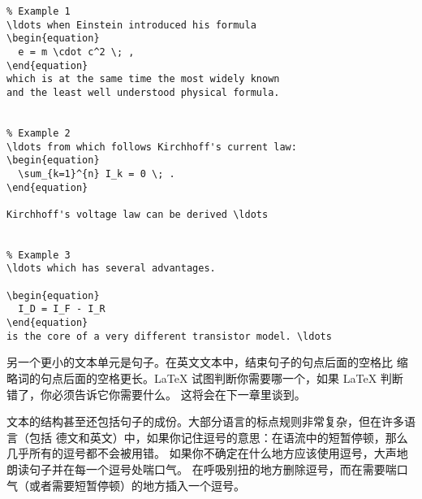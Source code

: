 \begin{code}
\begin{verbatim}
% Example 1
\ldots when Einstein introduced his formula
\begin{equation}
  e = m \cdot c^2 \; ,
\end{equation}
which is at the same time the most widely known
and the least well understood physical formula.


% Example 2
\ldots from which follows Kirchhoff's current law:
\begin{equation}
  \sum_{k=1}^{n} I_k = 0 \; .
\end{equation}

Kirchhoff's voltage law can be derived \ldots


% Example 3
\ldots which has several advantages.

\begin{equation}
  I_D = I_F - I_R
\end{equation}
is the core of a very different transistor model. \ldots
\end{verbatim}
\end{code}

另一个更小的文本单元是句子。在英文文本中，结束句子的句点后面的空格比
缩略词的句点后面的空格更长。\LaTeX{} 试图判断你需要哪一个，如果 \LaTeX{} 判断
错了，你必须告诉它你需要什么。 这将会在下一章里谈到。

文本的结构甚至还包括句子的成份。大部分语言的标点规则非常复杂，但在许多语言（包括
德文和英文）中，如果你记住逗号的意思：在语流中的短暂停顿，那么几乎所有的逗号都不会被用错。
如果你不确定在什么地方应该使用逗号，大声地朗读句子并在每一个逗号处喘口气。
在呼吸别扭的地方删除逗号，而在需要喘口气（或者需要短暂停顿）的地方插入一个逗号。

